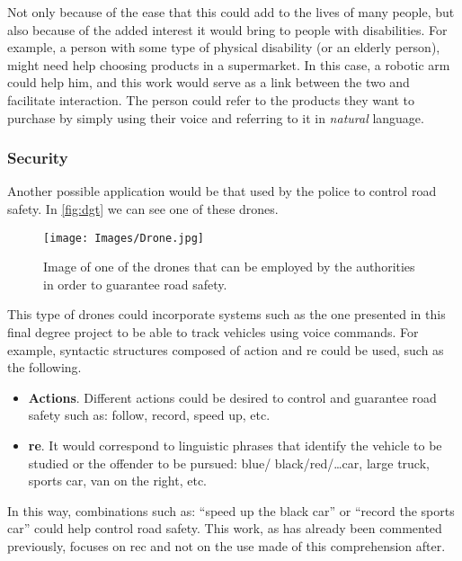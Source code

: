 Not only because of the ease that this could add to the lives of many people,
but also because of the added interest it would bring to people with
disabilities. For example, a person with some type of physical disability (or
an elderly person), might need help choosing products in a supermarket. In this
case, a robotic arm could help him, and this work would serve as a link between
the two and facilitate interaction. The person could refer to the products they
want to purchase by simply using their voice and referring to it in
\emph{natural} language.

\subsubsection{Security}

Another possible application would be that used by the police to control road
safety. In \vref{fig:dgt} we can see one of these drones.

\begin{figure}[ht]
  \centering
  \texttt{[image: Images/Drone.jpg]}
  \caption[Drones employed for road safety]{Image of one of the drones that can
    be employed by the authorities in order to guarantee road safety.}
  \label{fig:dgt}
\end{figure}

This type of drones could incorporate systems such as the one presented in this
final degree project to be able to track vehicles using voice commands. For
example, syntactic structures composed of action and \gls{re} could be used,
such as the following.

\begin{itemize}
  \item \textbf{Actions}. Different actions could be desired to control and
  guarantee road safety such as: follow, record, speed up, etc.
  \item \textbf{\gls*{re}}. It would correspond to linguistic phrases that
  identify the vehicle to be studied or the offender to be pursued: blue/
  black/red/\ldots car, large truck, sports car, van on the right, etc.
\end{itemize}

In this way, combinations such as: ``speed up the black car'' or ``record the
sports car'' could help control road safety. This work, as has already been
commented previously, focuses on \gls{rec} and not on the use made of this
comprehension after.



